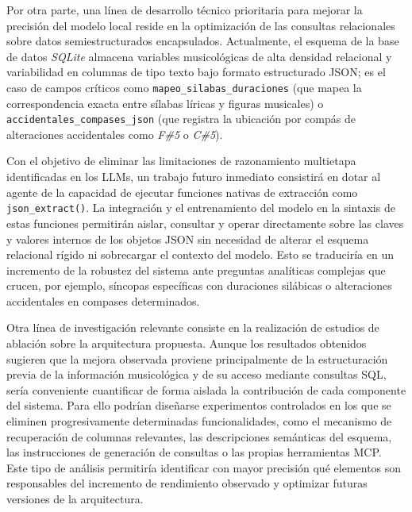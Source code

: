 Por otra parte, una línea de desarrollo técnico prioritaria para mejorar la precisión del modelo local reside en la optimización de las consultas relacionales sobre datos semiestructurados encapsulados. Actualmente, el esquema de la base de datos \textit{SQLite} almacena variables musicológicas de alta densidad relacional y variabilidad en columnas de tipo texto bajo formato estructurado JSON; es el caso de campos críticos como \texttt{mapeo\_silabas\_duraciones} (que mapea la correspondencia exacta entre sílabas líricas y figuras musicales) o \texttt{accidentales\_compases\_json} (que registra la ubicación por compás de alteraciones accidentales como \textit{F\#5} o \textit{C\#5}). 

Con el objetivo de eliminar las limitaciones de razonamiento multietapa identificadas en los LLMs, un trabajo futuro inmediato consistirá en dotar al agente de la capacidad de ejecutar funciones nativas de extracción como \texttt{json\_extract()}. La integración y el entrenamiento del modelo en la sintaxis de estas funciones permitirán aislar, consultar y operar directamente sobre las claves y valores internos de los objetos JSON sin necesidad de alterar el esquema relacional rígido ni sobrecargar el contexto del modelo. Esto se traduciría en un incremento de la robustez del sistema ante preguntas analíticas complejas que crucen, por ejemplo, síncopas específicas con duraciones silábicas o alteraciones accidentales en compases determinados.

Otra línea de investigación relevante consiste en la realización de estudios de ablación sobre la arquitectura propuesta. Aunque los resultados obtenidos sugieren que la mejora observada proviene principalmente de la estructuración previa de la información musicológica y de su acceso mediante consultas SQL, sería conveniente cuantificar de forma aislada la contribución de cada componente del sistema. Para ello podrían diseñarse experimentos controlados en los que se eliminen progresivamente determinadas funcionalidades, como el mecanismo de recuperación de columnas relevantes, las descripciones semánticas del esquema, las instrucciones de generación de consultas o las propias herramientas MCP. Este tipo de análisis permitiría identificar con mayor precisión qué elementos son responsables del incremento de rendimiento observado y optimizar futuras versiones de la arquitectura.

